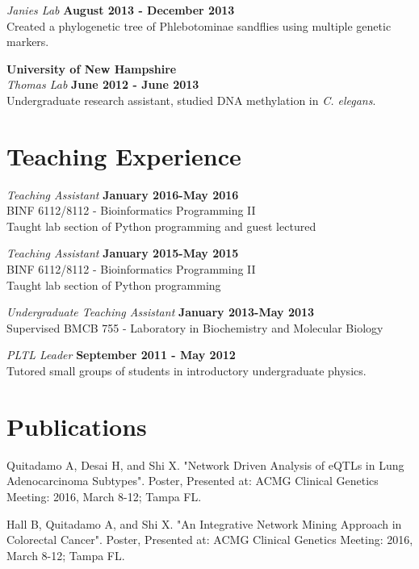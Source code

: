 \documentclass[margin,line]{res}
\begin{document}
\begin{resume}
{\em Janies Lab} \hfill {\bf August 2013 - December 2013}\\
Created a phylogenetic tree of Phlebotominae sandflies using multiple genetic markers.    
\hspace*{.05in} 

{\bf University of New Hampshire}\\
{\em Thomas Lab} \hfill {\bf June 2012 - June 2013}\\
Undergraduate research assistant, studied DNA methylation in {\em C. elegans}.\\ 


\section{\sc Teaching Experience}

{\em Teaching Assistant} \hfill {\bf January 2016-May 2016}\\
BINF 6112/8112 - Bioinformatics Programming II\\
Taught lab section of Python programming and guest lectured

{\em Teaching Assistant} \hfill {\bf January 2015-May 2015}\\
BINF 6112/8112 - Bioinformatics Programming II\\
Taught lab section of Python programming

{\em Undergraduate Teaching Assistant} \hfill {\bf January 2013-May 2013}\\
Supervised BMCB 755 - Laboratory in Biochemistry and Molecular Biology

{\em PLTL Leader} \hfill {\bf September 2011 - May 2012}\\
Tutored small groups of students in introductory undergraduate physics.

\section{\sc Publications}

Quitadamo A, Desai H, and Shi X. "Network Driven Analysis of eQTLs in Lung Adenocarcinoma Subtypes". Poster, Presented at: ACMG Clinical Genetics Meeting: 2016, March 8-12; Tampa FL.

Hall B, Quitadamo A, and Shi X. "An Integrative Network Mining Approach in Colorectal Cancer". Poster, Presented at: ACMG Clinical Genetics Meeting: 2016, March 8-12; Tampa FL.


\end{resume}
\end{document}
